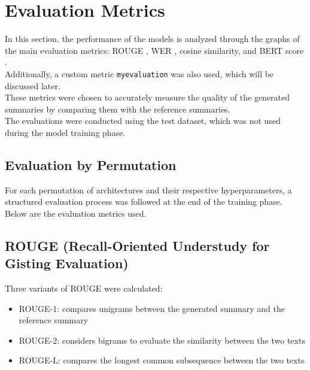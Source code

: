 \section{Evaluation Metrics}
In this section, the performance of the models is analyzed through the graphs of the main evaluation metrics: ROUGE \cite{lin-2004-rouge}, WER \cite{roy2021semanticwerunifiedmetricevaluation}, cosine similarity, and BERT score \cite{zhang2020bertscoreevaluatingtextgeneration}.\\
Additionally, a custom metric \texttt{myevaluation} was also used, which will be discussed later.\\
These metrics were chosen to accurately measure the quality of the generated summaries by comparing them with the reference summaries.\\
The evaluations were conducted using the test dataset, which was not used during the model training phase.\\

\subsection{Evaluation by Permutation}
For each permutation of architectures and their respective hyperparameters,
a structured evaluation process was followed at the end of the
training phase. Below are the evaluation metrics used.

\subsection{ROUGE (Recall-Oriented Understudy for Gisting Evaluation)}
Three variants of ROUGE were calculated:
\begin{itemize}
    \item ROUGE-1: compares unigrams between the generated summary and the reference summary
    \item ROUGE-2: considers bigrams to evaluate the similarity between the two texts
    \item ROUGE-L: compares the longest common subsequence between the two texts
\end{itemize}

